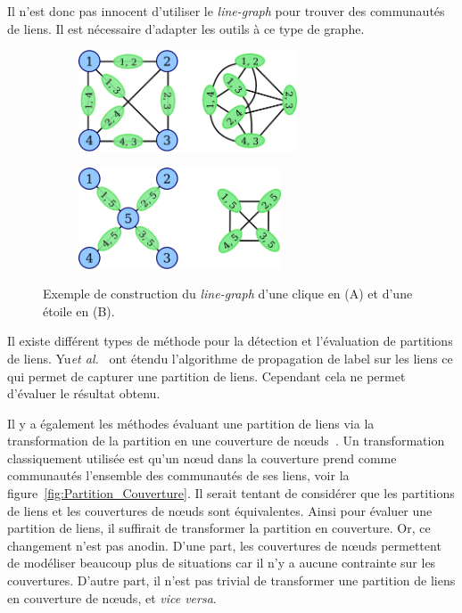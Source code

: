Il n'est donc pas innocent d'utiliser le \emph{line-graph} pour trouver des communautés de liens.
Il est nécessaire d'adapter les outils à ce type de graphe.
\begin{figure}
\centering
	\hfill
	\begin{subfigure}{0.4\textwidth}
		\includegraphics[height=3cm]{img/ExpectedNodes/Example/transfo_clique}
		\caption{}
		\label{fig:ex_lineG_clique}	
	\end{subfigure}\hfill
	\begin{subfigure}{0.4\textwidth}
		\includegraphics[height=3cm]{img/ExpectedNodes/Example/transfo_etoile}
		\caption{}
		\label{fig:ex_lineG_etoile}	
	\end{subfigure}
	\hfill		

	\caption{Exemple de construction du \emph{line-graph} d'une clique en (A) et d'une étoile en (B).}
	\label{fig:fail_construction_lineG}
\end{figure}




Il existe différent types de méthode pour la détection et l'évaluation de partitions de liens.
Yu\emph{et al.}~\cite{Yu2013} ont étendu l'algorithme de propagation de label sur les liens ce qui permet de capturer une partition de liens.
Cependant cela ne permet d'évaluer le résultat obtenu.

Il y a également les méthodes évaluant une partition de liens via la transformation de la partition en une couverture de n\oe uds~\cite{Huang2013,Lim2014,Wu2010a}.
Un transformation classiquement utilisée est qu'un n\oe ud dans la couverture prend comme communautés l'ensemble des communautés de ses liens, voir la figure~\ref{fig:Partition_Couverture}.
Il serait tentant de considérer que les partitions de liens et les couvertures de n\oe uds sont équivalentes.
Ainsi pour évaluer une partition de liens, il suffirait de transformer la partition en couverture.
Or, ce changement n'est pas anodin.
D'une part, les couvertures de n\oe uds permettent de modéliser beaucoup plus de situations car il n'y a aucune contrainte sur les couvertures.
D'autre part, il n'est pas trivial de transformer une partition de liens en couverture de n\oe uds, et \emph{vice versa}.

